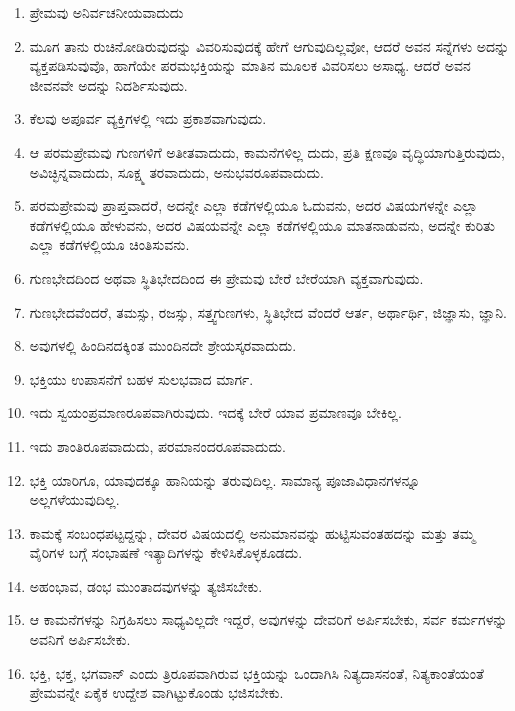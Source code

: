 \begin{enumerate}
\item ಪ್ರೇಮವು ಅನಿರ್ವಚನೀಯವಾದುದು

 \item ಮೂಗ ತಾನು ರುಚಿನೋಡಿರುವುದನ್ನು ವಿವರಿಸುವುದಕ್ಕೆ ಹೇಗೆ ಆಗುವುದಿಲ್ಲವೋ, ಆದರೆ ಅವನ ಸನ್ನೆಗಳು ಅದನ್ನು ವ್ಯಕ್ತಪಡಿಸುವುವೊ, ಹಾಗೆಯೇ ಪರಮಭಕ್ತಿಯನ್ನು ಮಾತಿನ ಮೂಲಕ ವಿವರಿಸಲು ಅಸಾಧ್ಯ. ಆದರೆ ಅವನ ಜೀವನವೇ ಅದನ್ನು ನಿದರ್ಶಿಸುವುದು.

 \item ಕೆಲವು ಅಪೂರ್ವ ವ್ಯಕ್ತಿಗಳಲ್ಲಿ ಇದು ಪ್ರಕಾಶವಾಗುವುದು.

 \item ಆ ಪರಮಪ್ರೇಮವು ಗುಣಗಳಿಗೆ ಅತೀತವಾದುದು, ಕಾಮನೆಗಳಿಲ್ಲ ದುದು, ಪ್ರತಿ ಕ್ಷಣವೂ ವೃದ್ಧಿಯಾಗುತ್ತಿರುವುದು, ಅವಿಚ್ಛಿನ್ನವಾದುದು, ಸೂಕ್ಷ್ಮ ತರವಾದುದು, ಅನುಭವರೂಪವಾದುದು.

 \item ಪರಮಪ್ರೇಮವು ಪ್ರಾಪ್ತವಾದರೆ, ಅದನ್ನೇ ಎಲ್ಲಾ ಕಡೆಗಳಲ್ಲಿಯೂ ಓದುವನು, ಅದರ ವಿಷಯಗಳನ್ನೇ ಎಲ್ಲಾ ಕಡೆಗಳಲ್ಲಿಯೂ ಹೇಳುವನು, ಅದರ ವಿಷಯವನ್ನೇ ಎಲ್ಲಾ ಕಡೆಗಳಲ್ಲಿಯೂ ಮಾತನಾಡುವನು, ಅದನ್ನೇ ಕುರಿತು ಎಲ್ಲಾ ಕಡೆಗಳಲ್ಲಿಯೂ ಚಿಂತಿಸುವನು.

 \item ಗುಣಭೇದದಿಂದ ಅಥವಾ ಸ್ಥಿತಿಭೇದದಿಂದ ಈ ಪ್ರೇಮವು ಬೇರೆ ಬೇರೆಯಾಗಿ ವ್ಯಕ್ತವಾಗುವುದು.

 \item ಗುಣಭೇದವೆಂದರೆ, ತಮಸ್ಸು, ರಜಸ್ಸು, ಸತ್ತ್ವಗುಣಗಳು, ಸ್ಥಿತಿಭೇದ ವೆಂದರೆ ಆರ್ತ, ಅರ್ಥಾರ್ಥಿ, ಜಿಜ್ಞಾಸು, ಜ್ಞಾನಿ.

 \item ಅವುಗಳಲ್ಲಿ ಹಿಂದಿನದಕ್ಕಿಂತ ಮುಂದಿನದೇ ಶ್ರೇಯಸ್ಕರವಾದುದು.

 \item ಭಕ್ತಿಯು ಉಪಾಸನೆಗೆ ಬಹಳ ಸುಲಭವಾದ ಮಾರ್ಗ.

 \item ಇದು ಸ್ವಯಂಪ್ರಮಾಣರೂಪವಾಗಿರುವುದು. ಇದಕ್ಕೆ ಬೇರೆ ಯಾವ ಪ್ರಮಾಣವೂ ಬೇಕಿಲ್ಲ.

 \item ಇದು ಶಾಂತಿರೂಪವಾದುದು, ಪರಮಾನಂದರೂಪವಾದುದು.

 \item ಭಕ್ತಿ ಯಾರಿಗೂ, ಯಾವುದಕ್ಕೂ ಹಾನಿಯನ್ನು ತರುವುದಿಲ್ಲ. ಸಾಮಾನ್ಯ ಪೂಜಾವಿಧಾನಗಳನ್ನೂ ಅಲ್ಲಗಳೆಯುವುದಿಲ್ಲ.

 \item ಕಾಮಕ್ಕೆ ಸಂಬಂಧಪಟ್ಟದ್ದನ್ನು, ದೇವರ ವಿಷಯದಲ್ಲಿ ಅನುಮಾನವನ್ನು ಹುಟ್ಟಿಸುವಂತಹದನ್ನು ಮತ್ತು ತಮ್ಮ ವೈರಿಗಳ ಬಗ್ಗೆ ಸಂಭಾಷಣೆ ಇತ್ಯಾದಿಗಳನ್ನು ಕೇಳಿಸಿಕೊಳ್ಳಕೂಡದು.

 \item ಅಹಂಭಾವ, ಡಂಭ ಮುಂತಾದವುಗಳನ್ನು ತ್ಯಜಿಸಬೇಕು.

 \item ಆ ಕಾಮನೆಗಳನ್ನು ನಿಗ್ರಹಿಸಲು ಸಾಧ್ಯವಿಲ್ಲದೇ ಇದ್ದರೆ, ಅವುಗಳನ್ನು ದೇವರಿಗೆ ಅರ್ಪಿಸಬೇಕು, ಸರ್ವ ಕರ್ಮಗಳನ್ನು ಅವನಿಗೆ ಅರ್ಪಿಸಬೇಕು.

 \item ಭಕ್ತಿ, ಭಕ್ತ, ಭಗವಾನ್​ ಎಂದು ತ್ರಿರೂಪವಾಗಿರುವ ಭಕ್ತಿಯನ್ನು ಒಂದಾಗಿಸಿ ನಿತ್ಯದಾಸನಂತೆ, ನಿತ್ಯಕಾಂತೆಯಂತೆ ಪ್ರೇಮವನ್ನೇ ಏಕೈಕ ಉದ್ದೇಶ ವಾಗಿಟ್ಟುಕೊಂಡು ಭಜಿಸಬೇಕು.

\end{enumerate}

